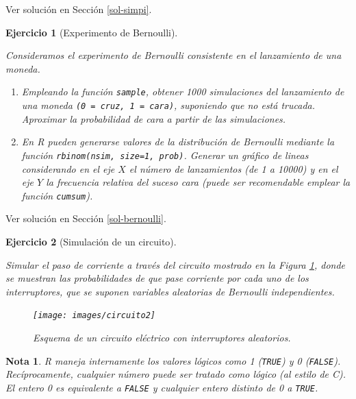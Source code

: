 \documentclass[
]{book}
\theoremstyle{break}
\newtheorem{exercise}{Ejercicio}[chapter]
\theoremstyle{nonumberplain}
\newtheorem{remark}{Nota}
\begin{document}
Ver solución en Sección \ref{sol-simpi}.

\begin{exercise}[Experimento de Bernoulli]
\protect\hypertarget{exr:bernoulli}{}\label{exr:bernoulli}

Consideramos el experimento de Bernoulli consistente en el
lanzamiento de una moneda.

\begin{enumerate}
\def\labelenumi{\alph{enumi})}
\item
  Empleando la función \texttt{sample}, obtener 1000 simulaciones del
  lanzamiento de una moneda \texttt{(0\ =\ cruz,\ 1\ =\ cara)}, suponiendo que
  no está trucada. Aproximar la probabilidad de cara a partir de
  las simulaciones.
\item
  En R pueden generarse valores de la distribución de Bernoulli
  mediante la función \texttt{rbinom(nsim,\ size=1,\ prob)}. Generar un
  gráfico de lineas considerando en el eje \(X\) el número de
  lanzamientos (de 1 a 10000) y en el eje \(Y\) la frecuencia
  relativa del suceso cara (puede ser recomendable emplear la
  función \texttt{cumsum}).
\end{enumerate}

\end{exercise}

Ver solución en Sección \ref{sol-bernoulli}.

\begin{exercise}[Simulación de un circuito]
\protect\hypertarget{exr:circuito}{}\label{exr:circuito}

Simular el paso de corriente a través del circuito mostrado en la Figura \ref{fig:circuito2}, donde se muestran las probabilidades de que pase corriente por cada uno de los interruptores, que se suponen variables aleatorias de Bernoulli independientes.

\begin{figure}[!htb]

{\centering \texttt{[image: images/circuito2]} 

}

\caption{Esquema de un circuito eléctrico con interruptores aleatorios.}\label{fig:circuito2}
\end{figure}

\end{exercise}

\begin{remark}
R maneja internamente los valores lógicos como 1 (\texttt{TRUE}) y 0 (\texttt{FALSE}).
Recíprocamente, cualquier número puede ser tratado como lógico (al estilo de C).
El entero 0 es equivalente a \texttt{FALSE} y cualquier entero distinto de 0 a \texttt{TRUE}.
\end{remark}
\end{document}
